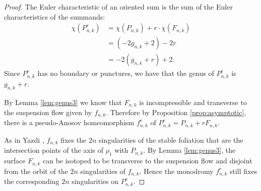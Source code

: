 \begin{proof}
  The Euler characteristic of an oriented sum is the sum of the Euler characteristics of the summands:
  \begin{align*}
    \chi(P^r_{n,k}) &= \chi(P_{n,k}) + r\cdot\chi(F_{n,k}) \\
                    &= (-2g_{n,k} + 2)-2r \\
                    &= -2(g_{n,k} + r) + 2.
  \end{align*}
  Since $P_{n,k}^r$ has no boundary or punctures, we have that the genus of $P_{n,k}^r$ is $g_{n,k}+r$.

  By Lemma \ref{lem:genus3} we know that $F_{n,k}$ is incompressible and transverse to the suspension flow given by $f_{n,k}$.  Therefore by Proposition \ref{prop:asymptotic}, there is a pseudo-Anosov homeomorphism $f_{n,k}^r$ of $P_{n,k}^r=P_{n,k}+rF_{n,k}$.
  

 As in Yazdi \cite[Lemma 3.5]{yazdibounds}, $f_{n,k}$ fixes the $2n$ singularities of the stable foliation that are the intersection points of the axis of $\rho_1$ with
  $P_{n,k}$. By Lemma \ref{lem:genus3}, the surface $F_{n,k}$ can be isotoped to be transverse to
  the suspension flow and disjoint from the orbit of the $2n$ singularities of $f_{n,k}$.  Hence the monodromy
  $f^r_{n,k}$ still fixes the corresponding $2n$ singularities on $P^r_{n,k}$.
\end{proof}

